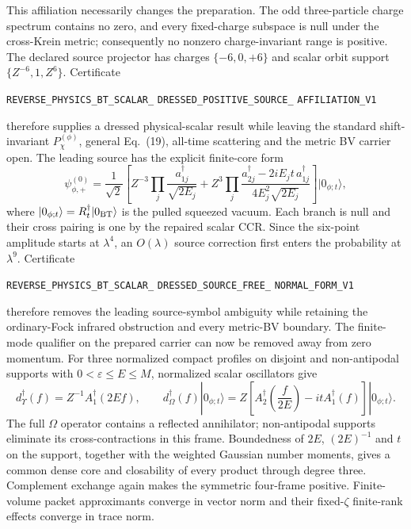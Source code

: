 \documentclass[11pt]{article}
\theoremstyle{definition}
\theoremstyle{remark}
\begin{document}
This affiliation necessarily changes the preparation.  The odd
three-particle charge spectrum contains no zero, and every fixed-charge
subspace is null under the cross-Krein metric; consequently no nonzero
charge-invariant range is positive.  The declared source projector has
charges $\{-6,0,+6\}$ and scalar orbit support $\{Z^{-6},1,Z^6\}$.
Certificate
\par\noindent
\texttt{REVERSE\_PHYSICS\_BT\_SCALAR\_}
\allowbreak\texttt{DRESSED\_POSITIVE\_SOURCE\_}
\allowbreak\texttt{AFFILIATION\_V1}
\par\noindent
therefore supplies a dressed physical-scalar result while leaving the
standard shift-invariant $P_\chi^{(\phi)}$, general Eq.~(19), all-time
scattering and the metric BV carrier open.
The leading source has the explicit finite-core form
\[
 \psi_{\phi,+}^{(0)}=\frac1{\sqrt2}\left[
 Z^{-3}\prod_j\frac{a_{1j}^\dagger}{\sqrt{2E_j}}
 +Z^3\prod_j\frac{a_{2j}^\dagger-2iE_jt\,a_{1j}^\dagger}
 {4E_j^2\sqrt{2E_j}}
 \right]|0_{\phi;t}\rangle,
\]
where $|0_{\phi;t}\rangle=R_t^\dagger|0_{\rm BT}\rangle$ is the pulled
squeezed vacuum.  Each branch is null and their cross pairing is one by the
repaired scalar CCR.  Since the six-point amplitude starts at $\lambda^4$,
an $O(\lambda)$ source correction first enters the probability at
$\lambda^9$.  Certificate
\par\noindent
\texttt{REVERSE\_PHYSICS\_BT\_SCALAR\_}
\allowbreak\texttt{DRESSED\_SOURCE\_FREE\_}
\allowbreak\texttt{NORMAL\_FORM\_V1}
\par\noindent
therefore removes the leading source-symbol ambiguity while retaining the
ordinary-Fock infrared obstruction and every metric-BV boundary.
The finite-mode qualifier on the prepared carrier can now be removed away
from zero momentum.  For three normalized compact profiles on disjoint and
non-antipodal supports with $0<\varepsilon\leq E\leq M$, normalized scalar
oscillators give
\[
 d_\Upsilon^\dagger(f)=Z^{-1}A_1^\dagger(2Ef),\qquad
 d_\Omega^\dagger(f)|0_{\phi;t}\rangle
 =Z\left[A_2^\dagger\!\left(\frac f{2E}\right)
          -itA_1^\dagger(f)\right]|0_{\phi;t}\rangle.
\]
The full $\Omega$ operator contains a reflected annihilator; non-antipodal
supports eliminate its cross-contractions in this frame.  Boundedness of
$2E$, $(2E)^{-1}$ and $t$ on the support, together with the weighted Gaussian
number moments, gives a common dense core and closability of every product
through degree three.  Complement exchange again makes the symmetric
four-frame positive.  Finite-volume packet approximants converge in vector
norm and their fixed-$\zeta$ finite-rank effects converge in trace norm.
\end{document}
